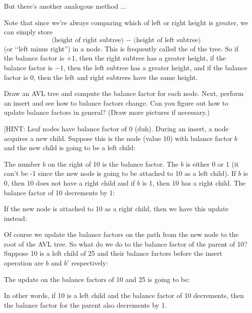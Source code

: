 \newpage
But there's another analogous method ... 

Note that since we're always comparing which
of left or right height is greater, we can simply store
\[
\text{(height of right subtree) $-$ (height of left subtree)}
\]
(or \lq\lq left minus right'') in a node.
This is frequently called the  of the tree.
So if the balance factor is $+1$, then the right subtree has a greater height,
if the balance factor is $-1$, then the left subtree has a greater height,
and if the balance factor is $0$, then the left and right subtrees have the
same height.


\newpage
\begin{ex}
  Draw an AVL tree and compute the balance factor for each node.
  Next, perform an insert and see how to balance factors change.
  Can you figure out how to update balance factors in general?
  (Draw more pictures if necessary.)
\end{ex}

[HINT:
Leaf nodes have balance factor of 0 (duh).
During an insert, a node acquires a new child.
Suppose this is the node (value 10) with balance factor $b$
and the new child is going to be a left child:



The number $b$ on the right of 10 is the balance factor.
The $b$ is either 0 or 1 (it can't be -1 since the new node
is going to be attached to 10 as a left child).
If $b$ is 0, then 10 does not have a
right child and if $b$ is 1, then 10 has a right child.
The balance factor of 10 decrements by 1:



If the new node is attached to 10 as a right child, then we have
this update instead:



Of course we update the balance factors on the path from the new node
to the root of the AVL tree.
So what do we do to the balance factor of the parent of 10?
Suppose 10 is a left child of 25
and their balance factors before the insert operation
are $b$ and  $b'$ respectively:



The update on the balance factors of 10 and 25 is going to be:



In other words, if 10 is a left child and the balance factor of 10 decrements,
then the balance factor for the parent also decrements by 1.


